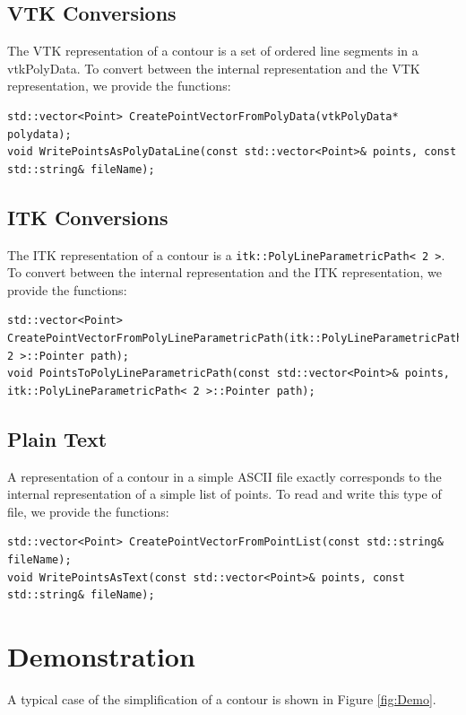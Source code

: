 \documentclass{InsightArticle}
\begin{document}
\subsection{VTK Conversions}
The VTK representation of a contour is a set of ordered line segments in a vtkPolyData. To convert between the internal representation and the VTK representation, we provide the functions:

\begin{verbatim}
std::vector<Point> CreatePointVectorFromPolyData(vtkPolyData* polydata);
void WritePointsAsPolyDataLine(const std::vector<Point>& points, const std::string& fileName);
\end{verbatim}

\subsection{ITK Conversions}
The ITK representation of a contour is a \verb|itk::PolyLineParametricPath< 2 >|. To convert between the internal representation and the ITK representation, we provide the functions:

\begin{verbatim}
std::vector<Point> CreatePointVectorFromPolyLineParametricPath(itk::PolyLineParametricPath< 2 >::Pointer path);
void PointsToPolyLineParametricPath(const std::vector<Point>& points, itk::PolyLineParametricPath< 2 >::Pointer path);
\end{verbatim}

\subsection{Plain Text}
A representation of a contour in a simple ASCII file exactly corresponds to the internal representation of a simple list of points. To read and write this type of file, we provide the functions:
\begin{verbatim}
std::vector<Point> CreatePointVectorFromPointList(const std::string& fileName);
void WritePointsAsText(const std::vector<Point>& points, const std::string& fileName);
\end{verbatim}


\section{Demonstration}

A typical case of the simplification of a contour is shown in Figure \ref{fig:Demo}.
\end{document}
